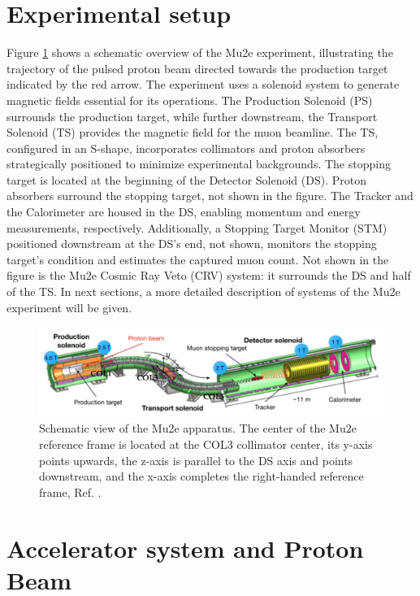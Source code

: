 \section{Experimental setup}\label{setup}
Figure \ref{fig:mu2escheme} shows a schematic overview of the Mu2e experiment, illustrating the trajectory of the pulsed proton beam directed towards the production target indicated by the red arrow. The experiment uses a solenoid system to generate magnetic fields essential for its operations. The Production Solenoid (PS) surrounds the production target, while further downstream, the Transport Solenoid (TS) provides the magnetic field for the muon beamline. The TS, configured in an S-shape, incorporates collimators and proton absorbers strategically positioned to minimize experimental backgrounds. The stopping target is located at the beginning of the Detector Solenoid (DS). Proton absorbers surround the stopping target, not shown in the figure. The Tracker and the Calorimeter are housed in the DS, enabling momentum and energy measurements, respectively. Additionally, a Stopping Target Monitor (STM) positioned downstream at the DS's end, not shown, monitors the stopping target's condition and estimates the captured muon count. Not shown in the figure is the Mu2e Cosmic Ray Veto (CRV) system: it surrounds the DS and half of the TS. In next sections, a more detailed description of systems of the Mu2e experiment will be given.
\begin{figure}[!h]
\centering
\includegraphics[width =\textwidth]{figures/png/Screenshot_20240301_143105.png}
\caption{Schematic view of the Mu2e apparatus. The center of the Mu2e reference frame is located at the COL3 collimator center, its y-axis points upwards, the z-axis is parallel to the DS axis and points downstream, and the x-axis completes the right-handed reference frame, Ref. \cite{universe9010054}.}
\label{fig:mu2escheme}
\end{figure}
\section{Accelerator system and Proton Beam}\label{accel}
